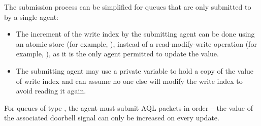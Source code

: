 \documentclass[final,oneside]{book}
\begin{document}
The submission process can be simplified for queues that are only submitted to
by a single agent:
\begin{itemize}[itemsep=1pt,topsep=3pt,partopsep=0pt]
\item The increment of the write index by the submitting agent can be done using
  an atomic store (for example, ),
  instead of a read-modify-write operation (for example,
  ), as it is the only agent
  permitted to update the value.
\item The submitting agent may use a private variable to hold a copy of the
  value of write index and can assume no one else will modify the write index to
  avoid reading it again.
\end{itemize}

For queues of type , the agent must submit
AQL packets in order -- the value of the associated doorbell signal can only be
increased on every update.



\end{document}
